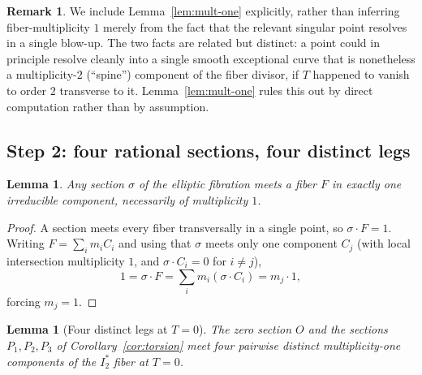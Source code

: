 \documentclass[11pt]{amsart}
\newtheorem{lemma}[theorem]{Lemma}
\theoremstyle{definition}
\newtheorem{remark}[theorem]{Remark}
\begin{document}
\begin{remark}
We include Lemma~\ref{lem:mult-one} explicitly, rather than inferring
fiber-multiplicity $1$ merely from the fact that the relevant singular
point resolves in a single blow-up. The two facts are related but
distinct: a point could in principle resolve cleanly into a single
smooth exceptional curve that is nonetheless a multiplicity-$2$
(``spine'') component of the fiber divisor, if $T$ happened to vanish to
order $2$ transverse to it. Lemma~\ref{lem:mult-one} rules this out by
direct computation rather than by assumption.
\end{remark}

\subsection*{Step 2: four rational sections, four distinct legs}

\begin{lemma}
\label{lem:one-component}
Any section $\sigma$ of the elliptic fibration meets a fiber $F$ in
exactly one irreducible component, necessarily of multiplicity $1$.
\end{lemma}

\begin{proof}
A section meets every fiber transversally in a single point, so
$\sigma\cdot F=1$. Writing $F=\sum_im_iC_i$ and using that $\sigma$ meets
only one component $C_j$ (with local intersection multiplicity $1$, and
$\sigma\cdot C_i=0$ for $i\neq j$),
\[
1 = \sigma\cdot F = \sum_i m_i(\sigma\cdot C_i) = m_j\cdot1,
\]
forcing $m_j=1$.
\end{proof}

\begin{lemma}[Four distinct legs at $T=0$]
\label{lem:four-legs}
The zero section $O$ and the sections $P_1,P_2,P_3$ of
Corollary~\ref{cor:torsion} meet four pairwise distinct multiplicity-one
components of the $I_2^*$ fiber at $T=0$.
\end{lemma}
\end{document}
